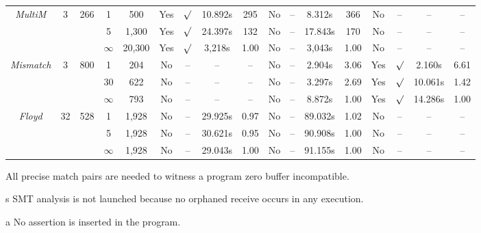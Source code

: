 \begin{savenotes}
\begin{table*}[t]
\begin{center}
\begin{threeparttable}
\begin{tabular}{|c|c|c|c|c|c|c|c|c|c|c|c|c|c|c|c|c|}
	 \multirow{3}{*}{\textit{MultiM}} & \multirow{3}{*}{3}& \multirow{3}{*}{266} & 1 & 500 & Yes  &$\surd$&10.892s& 295 & No & --& 8.312s&366 & No&-- &--\tnote{s} &-- \\ \cline{4-17}
								&				&                   & 5& 1,300 & Yes& $\surd$& 24.397s & 132 & No &-- &17.843s & 170&No&--&--\tnote{s}&--\\ \cline{4-17}
								&				&                   & $\infty$ & 20,300 & Yes & $\surd$ & 3,218s & 1.00& No&-- &  3,043s& 1.00&No&--&--\tnote{s}&--\\ \hline
								\hline
								
	 \multirow{3}{*}{\textit{Mismatch}} & \multirow{3}{*}{3}& \multirow{3}{*}{800} & 1 & 204 & No &-- &--\tnote{a} & --&No &-- & 2.904s & 3.06&Yes&$\surd$&2.160s& 6.61\\ \cline{4-17}
								&				& 			 & 30 & 622 & No&-- &--\tnote{a} &-- & No&-- & 3.297s& 2.69 &Yes&$\surd$&10.061s&1.42\\ \cline{4-17}
								&				& 			 & $\infty$& 793 &No &-- &--\tnote{a} &-- & No& --& 8.872s &1.00 &Yes&$\surd$&14.286s&1.00\\ \hline
								\hline
			
	 \multirow{3}{*}{\textit{Floyd}} & \multirow{3}{*}{32}& \multirow{3}{*}{528} &1& 1,928 & No&-- &29.925s & 0.97 & No & -- & 89.032s & 1.02 & No&--&--\tnote{s}&--\\ \cline{4-17}
								&				& 		     & 5&1,928 & No &-- &30.621s & 0.95 & No & -- & 90.908s& 1.00&No&--&--\tnote{s}&--\\ \cline{4-17}
								&				& 		     & $\infty$&1,928 &No &-- &29.043s &1.00 & No& -- &91.155s &1.00 &No&--&--\tnote{s}&--\\ \hline
           
        
         
\end{tabular}
\begin{tablenotes}
\item[\textdagger] All precise match pairs are needed to witness a program zero buffer incompatible.
\item[s] SMT analysis is not launched because no orphaned receive occurs in any execution.
\item[a] No assertion is inserted in the program.
\end{tablenotes}
     \end{threeparttable}
\end{center}
\end{table*}
\end{savenotes}

